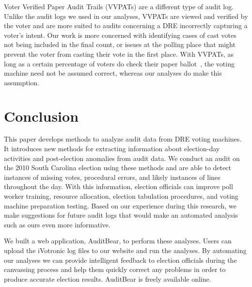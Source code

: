 \documentclass[letterpaper,twocolumn,10pt]{article}
\begin{document}
Voter Verified Paper Audit Trails (VVPATs) are a different type of audit
log. Unlike the audit logs we used in our analyses, VVPATs are viewed and
verified by the voter and are more suited to audits concerning a DRE incorrectly
capturing a voter’s intent. Our work is more concerned with identifying cases of
cast votes not being included in the final count, or issues at the polling place
that might prevent the voter from casting their vote in the first place. With
VVPATs, as long as a certain percentage of voters do check their paper
ballot~\cite{Hall2006}, the voting machine need not be assumed correct, whereas
our analyses do make this assumption. 

\section{Conclusion}
This paper develops methods to analyze audit data from DRE voting machines. It 
introduces new methods for extracting information about election-day activities
and post-election anomalies from audit data.  
We conduct an audit on the 2010 South Carolina 
election using these methods and are able to detect instances of missing votes,
procedural errors, and likely instances of lines throughout the day. With this
information, election officials can improve poll worker 
training, resource allocation, election tabulation procedures, and 
voting machine preparation testing. Based on our experience during this
research, we make suggestions for future audit logs that would make an automated
analysis such as ours even more informative.
 
We built a web application, AuditBear, to perform these analyses. Users can
upload the iVotronic log files to our website and run the analyses. By automating our
analyses we can provide intelligent feedback to election officials during the
canvassing process and help them quickly correct any problems in order to
produce accurate election results. AuditBear is freely available online.  
 


{\footnotesize 
}
\end{document}
